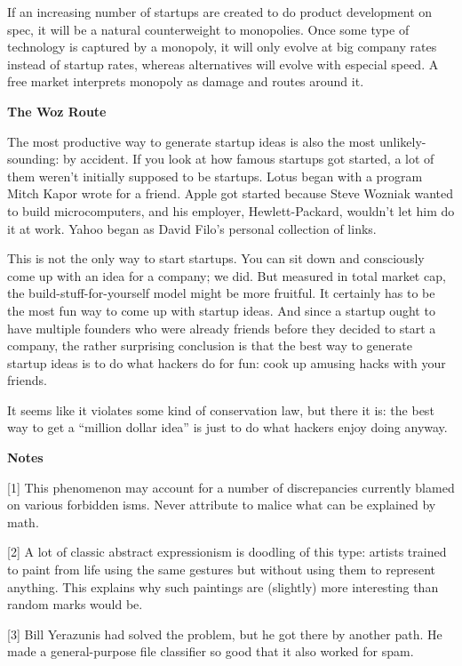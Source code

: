 If an increasing number of startups are created to do product
development on spec, it will be a natural counterweight to monopolies.
Once some type of technology is captured by a monopoly, it will only
evolve at big company rates instead of startup rates, whereas
alternatives will evolve with especial speed. A free market interprets
monopoly as damage and routes around it.

\textbf{The Woz Route}

The most productive way to generate startup ideas is also the most
unlikely-sounding: by accident. If you look at how famous startups got
started, a lot of them weren't initially supposed to be startups. Lotus
began with a program Mitch Kapor wrote for a friend. Apple got started
because Steve Wozniak wanted to build microcomputers, and his employer,
Hewlett-Packard, wouldn't let him do it at work. Yahoo began as David
Filo's personal collection of links.

This is not the only way to start startups. You can sit down and
consciously come up with an idea for a company; we did. But measured in
total market cap, the build-stuff-for-yourself model might be more
fruitful. It certainly has to be the most fun way to come up with
startup ideas. And since a startup ought to have multiple founders who
were already friends before they decided to start a company, the rather
surprising conclusion is that the best way to generate startup ideas is
to do what hackers do for fun: cook up amusing hacks with your friends.

It seems like it violates some kind of conservation law, but there it
is: the best way to get a ``million dollar idea'' is just to do what
hackers enjoy doing anyway.

\textbf{Notes}

{[}1{]} This phenomenon may account for a number of discrepancies
currently blamed on various forbidden isms. Never attribute to malice
what can be explained by math.

{[}2{]} A lot of classic abstract expressionism is doodling of this
type: artists trained to paint from life using the same gestures but
without using them to represent anything. This explains why such
paintings are (slightly) more interesting than random marks would be.

{[}3{]} Bill Yerazunis had solved the problem, but he got there by
another path. He made a general-purpose file classifier so good that it
also worked for spam.
